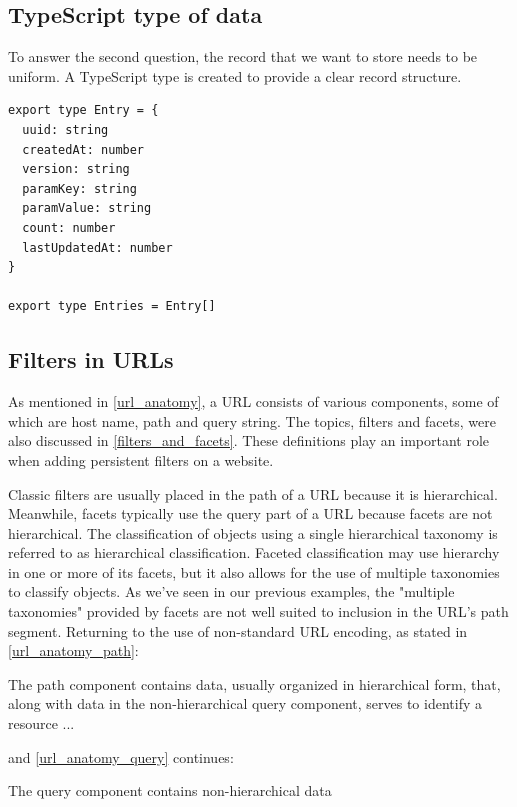 \subsection*{TypeScript type of data}
To answer the second question, the record that we want to store needs to be uniform. A TypeScript type is created to provide a clear record structure.

\begin{lstlisting}[style=es6, caption={TypeScript type of a record entry (TypeScript)}]
export type Entry = {
  uuid: string
  createdAt: number
  version: string
  paramKey: string
  paramValue: string
  count: number
  lastUpdatedAt: number
}

export type Entries = Entry[]
\end{lstlisting}

\subsection*{Filters in URLs}
As mentioned in \autoref{url_anatomy}, a URL consists of various components, some of which are host name, path and query string. The topics, filters and facets, were also discussed in \autoref{filters_and_facets}. These definitions play an important role when adding persistent filters on a website.

Classic filters are usually placed in the path of a URL because it is hierarchical. Meanwhile, facets typically use the query part of a URL because facets are not hierarchical. The classification of objects using a single hierarchical taxonomy is referred to as hierarchical classification. Faceted classification may use hierarchy in one or more of its facets, but it also allows for the use of multiple taxonomies to classify objects. As we've seen in our previous examples, the "multiple taxonomies" provided by facets are not well suited to inclusion in the URL's path segment. Returning to the use of non-standard URL encoding, as stated in \autoref{url_anatomy_path}:

\begin{displayquote}
  The path component contains data, usually organized in hierarchical form, that, along with data in the non-hierarchical query component, serves to identify a resource ...
\end{displayquote}

\noindent and \autoref{url_anatomy_query} continues:

\begin{displayquote}
  The query component contains non-hierarchical data
\end{displayquote}

